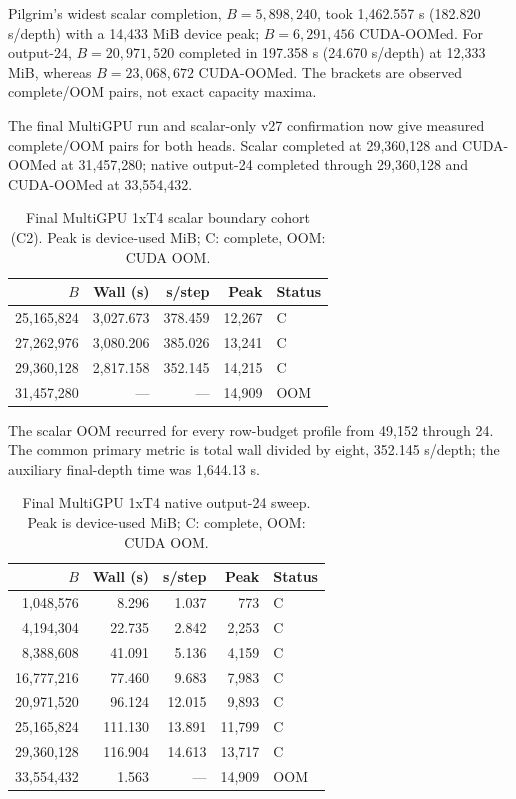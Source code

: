 \documentclass[10pt,twocolumn]{article}
\begin{document}
Pilgrim's widest scalar completion, $B=5{,}898{,}240$, took 1,462.557 s
(182.820 s/depth) with a 14,433 MiB device peak; $B=6{,}291{,}456$ CUDA-OOMed.
For output-24, $B=20{,}971{,}520$ completed in 197.358 s
(24.670 s/depth) at 12,333 MiB, whereas $B=23{,}068{,}672$ CUDA-OOMed. The
brackets are observed complete/OOM pairs, not exact capacity maxima.

The final MultiGPU run and scalar-only v27 confirmation now
give measured complete/OOM pairs for both heads. Scalar completed at
29,360,128 and CUDA-OOMed at 31,457,280; native output-24 completed through
29,360,128 and CUDA-OOMed at 33,554,432.

\begin{table}[t]
\centering
\small
\setlength{\tabcolsep}{2pt}
\caption{Final MultiGPU 1xT4 scalar boundary cohort (C2).
Peak is device-used MiB; C: complete, OOM: CUDA OOM.}
\label{tab:multigpu_v11_partial}
\begin{tabular}{@{}rrrrl@{}}
\toprule
$B$ & Wall (s) & s/step & Peak & Status \\
\midrule
25,165,824 & 3,027.673 & 378.459 & 12,267 & C \\
27,262,976 & 3,080.206 & 385.026 & 13,241 & C \\
29,360,128 & 2,817.158 & 352.145 & 14,215 & C \\
31,457,280 & --- & --- & 14,909 & OOM \\
\bottomrule
\end{tabular}
\end{table}

The scalar OOM recurred for every row-budget profile from 49,152 through 24.
The common primary metric is total wall divided by eight, 352.145 s/depth;
the auxiliary final-depth time was 1,644.13 s.

\begin{table}[t]
\centering
\small
\setlength{\tabcolsep}{2pt}
\caption{Final MultiGPU 1xT4 native output-24 sweep.
Peak is device-used MiB; C: complete, OOM: CUDA OOM.}
\label{tab:multigpu_output24}
\begin{tabular}{@{}rrrrl@{}}
\toprule
$B$ & Wall (s) & s/step & Peak & Status \\
\midrule
1,048,576 & 8.296 & 1.037 & 773 & C \\
4,194,304 & 22.735 & 2.842 & 2,253 & C \\
8,388,608 & 41.091 & 5.136 & 4,159 & C \\
16,777,216 & 77.460 & 9.683 & 7,983 & C \\
20,971,520 & 96.124 & 12.015 & 9,893 & C \\
25,165,824 & 111.130 & 13.891 & 11,799 & C \\
29,360,128 & 116.904 & 14.613 & 13,717 & C \\
33,554,432 & 1.563 & --- & 14,909 & OOM \\
\bottomrule
\end{tabular}
\end{table}
\end{document}

